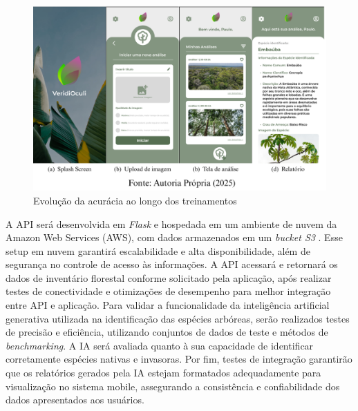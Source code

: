 \begin{figure}[!h]
    \centering
    \caption{Evolução da acurácia ao longo dos treinamentos}
    \label{Gráfico 3}
    \includegraphics[width=0.8\linewidth]{Illustrations/aplicacaomobile.png}
  
\end{figure}

A API será desenvolvida em \textit{Flask} e hospedada em um ambiente de nuvem da Amazon Web Services (AWS), com dados armazenados em um \textit{bucket S3} . Esse setup em nuvem garantirá escalabilidade e alta disponibilidade, além de segurança no controle de acesso às informações. A API acessará e retornará os dados de inventário florestal conforme solicitado pela aplicação, após realizar testes de conectividade e otimizações de desempenho para melhor integração entre API e aplicação. Para validar a funcionalidade da inteligência artificial generativa utilizada na identificação das espécies arbóreas, serão realizados testes de precisão e eficiência, utilizando conjuntos de dados de teste e métodos de \textit{benchmarking}. A IA será avaliada quanto à sua capacidade de identificar corretamente espécies nativas e invasoras. Por fim, testes de integração garantirão que os relatórios gerados pela IA estejam formatados adequadamente para visualização no sistema mobile, assegurando a consistência e confiabilidade dos dados apresentados aos usuários.